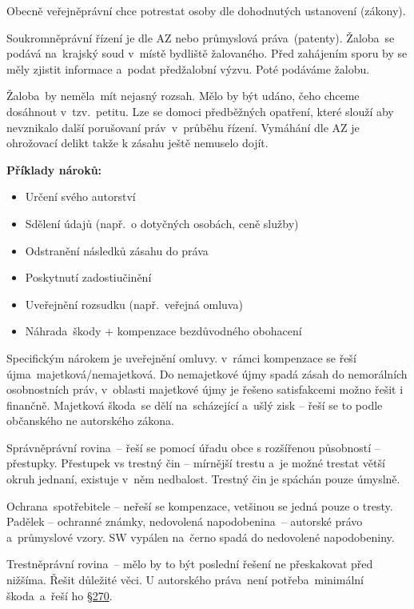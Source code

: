 \noindent Obecně veřejněprávní chce potrestat osoby dle dohodnutých ustanovení (zákony).

Soukromněprávní řízení je dle AZ nebo průmyslová práva~(patenty). Žaloba~se podává na~krajský soud v~místě bydliště žalovaného. Před zahájením sporu by se měly zjistit informace a~podat předžalobní výzvu. Poté podáváme žalobu.

Žaloba~by neměla~mít nejasný rozsah. Mělo by být udáno, čeho chceme dosáhnout v~tzv.\ petitu. Lze se domoci předběžných opatření, které slouží aby nevznikalo další porušovaní práv~v~průběhu řízení. Vymáhání dle AZ je ohrožovací delikt takže k zásahu ještě nemuselo dojít.
\newline

\noindent\textbf{Příklady nároků:}
\begin{itemize}[noitemsep]
    \item Určení svého autorství
    \item Sdělení údajů (např.\ o dotyčných osobách, ceně služby)
    \item Odstranění následků zásahu do práva
    \item Poskytnutí zadostiučinění
    \item Uveřejnění rozsudku (např.\ veřejná omluva)
    \item Náhrada~škody + kompenzace bezdůvodného obohacení
\end{itemize}

Specifickým nárokem je uveřejnění omluvy. v~rámci kompenzace se řeší újma~majetková/nemajetková. Do nemajetkové újmy spadá zásah do nemorálních osobnostních práv, v~oblasti majetkové újmy je řešeno satisfakcemi možno řešit i finančně. Majetková škoda~se dělí na~scházející a~ušlý zisk -- řeší se to podle občanského ne autorského zákona.

Správněprávní rovina~-- řeší se pomocí úřadu obce s rozšířenou působností -- přestupky. Přestupek vs trestný čin -- mírnější trestu a~je možné trestat větší okruh jednaní, existuje v~něm nedbalost. Trestný čin je spáchán pouze úmyslně.

Ochrana~spotřebitele -- neřeší se kompenzace, vetšinou se jedná pouze o tresty. Padělek -- ochranné známky, nedovolená napodobenina~-- autorské právo a~průmyslové vzory. SW vypálen na~černo spadá do nedovolené napodobeniny.

Trestněprávní rovina~-- mělo by to být poslední řešení ne přeskakovat před nižšíma. Řešit důležité věci. U autorského práva~není potřeba~minimální škoda~a~řeší ho \href{https://www.zakonyprolidi.cz/cs/2009-40#p270}{§270}.


